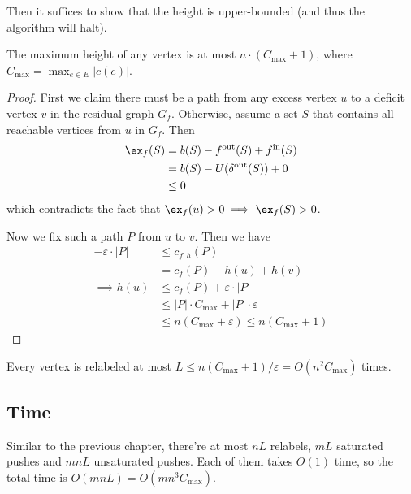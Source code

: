 Then it suffices to show that the height is upper-bounded (and thus the algorithm will halt).

\begin{lemma}
	The maximum height of any vertex is at most $n \cdot (C_{\max} + 1)$, where $C_{\max} = \max_{e \in E} |c(e)|$.
\end{lemma}
\begin{proof}
  First we claim there must be a path from any excess vertex $u$ to a deficit vertex $v$ in the residual graph $G_f$.
  Otherwise, assume a set $S$ that contains all reachable vertices from $u$ in $G_f$. Then
  \begin{align*}
    \ex_f(S) &= b(S) - f^{\text{out}}(S) + f^{\text{in}}(S) \\
             &= b(S) - U(\delta^{\text{out}}(S)) + 0 \\
             &\le 0
  \end{align*}
  which contradicts the fact that $\ex_f(u) > 0 \implies \ex_f(S) > 0$.

	Now we fix such a path $P$ from $u$ to $v$. Then we have
	\begin{align*}
		-\varepsilon \cdot |P| & \le c_{f,h}(P)                                    \\
		                       & = c_f(P) - h(u) + h(v)                            \\
		\implies h(u)          & \le c_f(P) + \varepsilon \cdot |P|                \\
		                       & \le |P| \cdot C_{\max} + |P| \cdot \varepsilon    \\
		                       & \le n(C_{\max} + \varepsilon) \le n(C_{\max} + 1)
	\end{align*}
\end{proof}

\begin{corollary}
	Every vertex is relabeled at most $L \le n(C_{\max} + 1)/\varepsilon = O(n^2 C_{\max})$ times.
\end{corollary}

\subsection{Time}

Similar to the previous chapter, there're at most $nL$ relabels, $mL$ saturated pushes and $mnL$ unsaturated pushes. Each of them takes $O(1)$ time, so the total time is $O(mnL) = O(m n^3 C_{\max})$.


